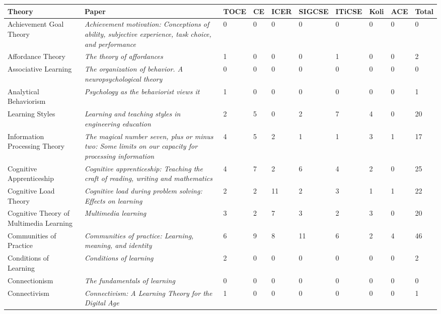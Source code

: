 \begin{table*}[t]
\begin{tabular}{p{3cm}p{7cm}llllllll}
Theory&Paper&TOCE&CE&ICER&SIGCSE&ITiCSE&Koli&ACE&Total\\\hline
Achievement Goal Theory & \textit{Achievement motivation: Conceptions of ability, subjective experience, task choice, and performance}~\cite{nicholls1984achievement} & 0 & 0 & 0 & 0 & 0 & 0 & 0 & 0\\
Affordance Theory & \textit{The theory of affordances}~\cite{gibson1977theory} & 1 & 0 & 0 & 0 & 1 & 0 & 0 & 2\\
Associative Learning & \textit{The organization of behavior. A neuropsychological theory}~\cite{hebb1949organization} & 0 & 0 & 0 & 0 & 0 & 0 & 0 & 0\\
Analytical Behaviorism & \textit{Psychology as the behaviorist views it}~\cite{watson1913psychology} & 1 & 0 & 0 & 0 & 0 & 0 & 0 & 1\\
Learning Styles & \textit{Learning and teaching styles in engineering education}~\cite{felder1988learning} & 2 & 5 & 0 & 2 & 7 & 4 & 0 & 20\\
Information Processing Theory & \textit{The magical number seven, plus or minus two: Some limits on our capacity for processing information}~\cite{miller1956magical} & 4 & 5 & 2 & 1 & 1 & 3 & 1 & 17\\
Cognitive Apprenticeship & \textit{Cognitive apprenticeship: Teaching the craft of reading, writing and mathematics}~\cite{collins1988cognitive} & 4 & 7 & 2 & 6 & 4 & 2 & 0 & 25\\
Cognitive Load Theory & \textit{Cognitive load during problem solving: Effects on learning}~\cite{sweller1988cognitive} & 2 & 2 & 11 & 2 & 3 & 1 & 1 & 22\\
Cognitive Theory of Multimedia Learning & \textit{Multimedia learning}~\cite{mayer2002multimedia} & 3 & 2 & 7 & 3 & 2 & 3 & 0 & 20\\
Communities of Practice & \textit{Communities of practice: Learning, meaning, and identity}~\cite{wenger1999communities} & 6 & 9 & 8 & 11 & 6 & 2 & 4 & 46\\
Conditions of Learning & \textit{Conditions of learning}~\cite{gagne1965conditions} & 2 & 0 & 0 & 0 & 0 & 0 & 0 & 2\\
Connectionism & \textit{The fundamentals of learning}~\cite{thorndike1932fundamentals} & 0 & 0 & 0 & 0 & 0 & 0 & 0 & 0\\
Connectivism & \textit{Connectivism: A Learning Theory for the Digital Age}~\cite{siemens2004connectivism} & 1 & 0 & 0 & 0 & 0 & 0 & 0 & 1\\

\end{tabular}
\end{table*}
